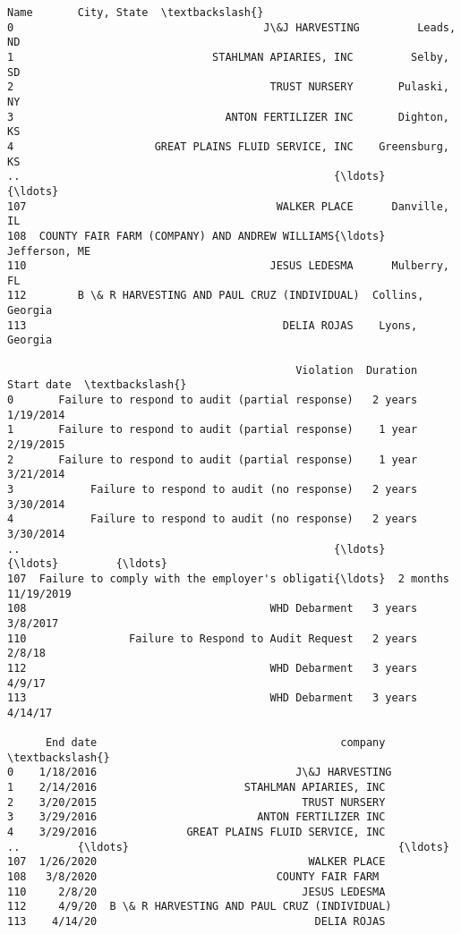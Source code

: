 \documentclass[11pt]{article}
\makeatletter
\newcommand{\boxspacing}{\kern\kvtcb@left@rule\kern\kvtcb@boxsep}
\newcommand{\prompt}[4]{
        {\ttfamily\llap{{\color{#2}[#3]:\hspace{3pt}#4}}\vspace{-\baselineskip}}
    }
\makeatother
\begin{document}
            \begin{tcolorbox}[breakable, size=fbox, boxrule=.5pt, pad at break*=1mm, opacityfill=0]
\prompt{Out}{outcolor}{172}{\boxspacing}
\begin{Verbatim}[commandchars=\\\{\}]
                                                  Name       City, State  \textbackslash{}
0                                       J\&J HARVESTING         Leads, ND
1                               STAHLMAN APIARIES, INC         Selby, SD
2                                        TRUST NURSERY       Pulaski, NY
3                                 ANTON FERTILIZER INC       Dighton, KS
4                      GREAT PLAINS FLUID SERVICE, INC    Greensburg, KS
..                                                 {\ldots}               {\ldots}
107                                       WALKER PLACE      Danville, IL
108  COUNTY FAIR FARM (COMPANY) AND ANDREW WILLIAMS{\ldots}     Jefferson, ME
110                                      JESUS LEDESMA      Mulberry, FL
112        B \& R HARVESTING AND PAUL CRUZ (INDIVIDUAL)  Collins, Georgia
113                                        DELIA ROJAS    Lyons, Georgia

                                             Violation  Duration  Start date  \textbackslash{}
0       Failure to respond to audit (partial response)   2 years   1/19/2014
1       Failure to respond to audit (partial response)    1 year   2/19/2015
2       Failure to respond to audit (partial response)    1 year   3/21/2014
3            Failure to respond to audit (no response)   2 years   3/30/2014
4            Failure to respond to audit (no response)   2 years   3/30/2014
..                                                 {\ldots}       {\ldots}         {\ldots}
107  Failure to comply with the employer's obligati{\ldots}  2 months  11/19/2019
108                                      WHD Debarment   3 years    3/8/2017
110                Failure to Respond to Audit Request   2 years      2/8/18
112                                      WHD Debarment   3 years      4/9/17
113                                      WHD Debarment   3 years     4/14/17

      End date                                      company  \textbackslash{}
0    1/18/2016                               J\&J HARVESTING
1    2/14/2016                       STAHLMAN APIARIES, INC
2    3/20/2015                                TRUST NURSERY
3    3/29/2016                         ANTON FERTILIZER INC
4    3/29/2016              GREAT PLAINS FLUID SERVICE, INC
..         {\ldots}                                          {\ldots}
107  1/26/2020                                 WALKER PLACE
108   3/8/2020                            COUNTY FAIR FARM
110     2/8/20                                JESUS LEDESMA
112     4/9/20  B \& R HARVESTING AND PAUL CRUZ (INDIVIDUAL)
113    4/14/20                                  DELIA ROJAS


\end{Verbatim}
\end{tcolorbox}
\end{document}

